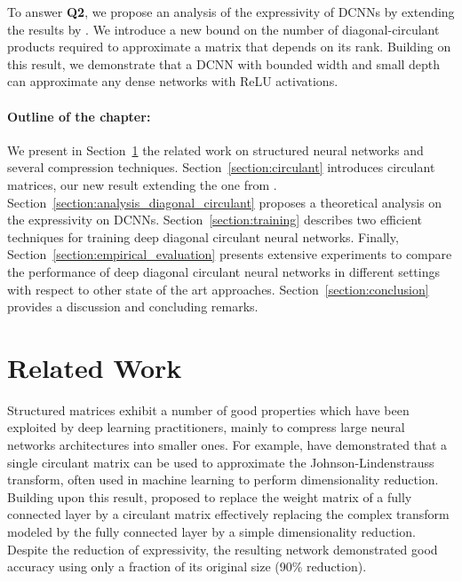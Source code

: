 To answer \textbf{Q2}, we propose an analysis of the expressivity of DCNNs by extending the results by \citet{Huhtanen2015}.
We introduce a new bound on the number of diagonal-circulant products required to approximate a matrix that depends on its rank.
Building on this result, we demonstrate that a DCNN with bounded width and small depth can approximate any dense networks with ReLU activations. 

\paragraph{Outline of the chapter:}
We present in Section~\ref{section:related_work} the related work on structured neural networks and several compression techniques.
Section~\ref{section:circulant} introduces circulant matrices, our new result extending the one from \citet{Huhtanen2015}.
Section~\ref{section:analysis_diagonal_circulant} proposes a theoretical analysis on the expressivity on DCNNs.
Section~\ref{section:training} describes two efficient techniques for training deep diagonal circulant neural networks.
Finally, Section~\ref{section:empirical_evaluation} presents extensive experiments to compare the performance of deep diagonal circulant neural networks in different settings with respect to other state of the art approaches.
Section~\ref{section:conclusion} provides a discussion and concluding remarks.


\section{Related Work}
\label{section:related_work}

Structured matrices exhibit a number of good properties which have been exploited by deep learning practitioners, mainly to compress large neural networks architectures into smaller ones.
For example, \citet{hinrichs2011johnson} have demonstrated that a single circulant matrix can be used to approximate the Johnson-Lindenstrauss transform, often used in machine learning to perform dimensionality reduction.
Building upon this result, \citet{cheng} proposed to replace the weight matrix of a fully connected layer by a circulant matrix effectively replacing the complex transform modeled by the fully connected layer by a simple dimensionality reduction.
Despite the reduction of expressivity, the resulting network demonstrated good accuracy using only a fraction of its original size (90\% reduction).


